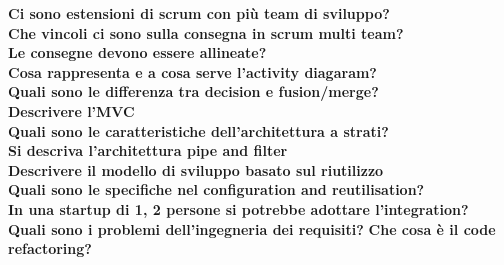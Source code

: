 \textbf{Ci sono estensioni di scrum con più team di sviluppo?}\\
\textbf{Che vincoli ci sono sulla consegna in scrum multi team?}\\
\textbf{Le consegne devono essere allineate?}\\
\textbf{Cosa rappresenta e a cosa serve l'activity diagaram?}\\
\textbf{Quali sono le differenza tra decision e fusion/merge?}\\
\textbf{Descrivere l'MVC}\\
\textbf{Quali sono le caratteristiche dell'architettura a strati?}\\
\textbf{Si descriva l'architettura pipe and filter}\\
\textbf{Descrivere il modello di sviluppo basato sul riutilizzo}\\
\textbf{Quali sono le specifiche nel configuration and reutilisation?}\\
\textbf{In una startup di 1, 2 persone si potrebbe adottare l'integration?}\\
\textbf{Quali sono i problemi dell'ingegneria dei requisiti?}
\textbf{Che cosa è il code refactoring?}